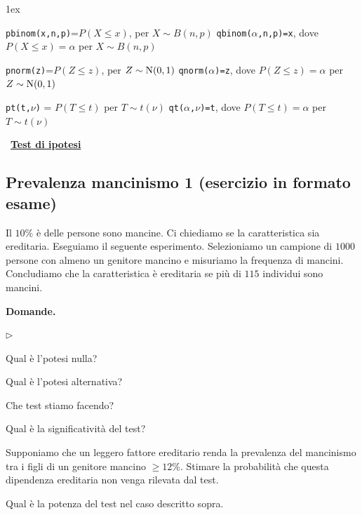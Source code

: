 \documentclass[11pt,openany]{book}
\newcommand{\mylabel}[1]{{\footnotesize\textsf{#1}}\hfill}
\renewenvironment{itemize}
  {\begin{list}{$\triangleright$}{%
   \setlength{\parskip}{0mm}
   \setlength{\topsep}{.2\baselineskip}
   \setlength{\rightmargin}{0mm}
   \setlength{\listparindent}{0mm}
   \setlength{\itemindent}{0mm}
   \setlength{\labelwidth}{3ex}
   \setlength{\itemsep}{.4\baselineskip}
   \setlength{\parsep}{0mm}
   \setlength{\partopsep}{0mm}
   \setlength{\labelsep}{1ex}
   \setlength{\leftmargin}{\labelwidth+\labelsep}
   \let\makelabel\mylabel}}{%
   \end{list}\vspace*{-1.3mm}}
\begin{document}
\vfill
\parskip1ex
{\hrulefill\scriptsize

{\tt pbinom(x,n,p)}=$P(X\le x)$, per $X\sim B(n,p)$
\hfill 
{\tt qbinom($\alpha$,n,p)=x},  dove $P(X\le x)=\alpha$ per $X\sim B(n,p)$

{\tt pnorm(z)}=$P(Z\le z)$, per $Z\sim {\rm N}(0,1)$
\hfill 
{\tt qnorm($\alpha$)=z},  dove $P(Z\le z)=\alpha$ per $Z\sim {\rm N}(0,1)$

{\tt pt(t,$\nu$)} = $P(T\le t)$ per $T\sim t(\nu)$
\hfill
{\tt qt($\alpha$,$\nu$)=t}, dove $P(T\le t)=\alpha$ per $T\sim t(\nu)$

}

\clearpage\
\hfill\textbf{{\color{brown}\hyperref[test_ipotesi]{Test di ipotesi \faShare}}}
\subsection{Prevalenza mancinismo 1 (esercizio in formato esame)}
\label{Prevalenza mancinismo 1}

Il $10\%$ è delle persone sono mancine. Ci chiediamo se la caratteristica sia ereditaria. Eseguiamo il seguente esperimento. Selezioniamo un campione di $1000$ persone con almeno un genitore mancino e misuriamo la frequenza di mancini. Concludiamo che la caratteristica \`e ereditaria se pi\`u di $115$ individui sono mancini.

\textbf{Domande.}

\begin{itemize}
\item[1.] Qual è l'potesi nulla?

\item[2.] Qual è l'potesi alternativa?

\item[3.] Che test stiamo facendo?

\item[4.] Qual è la significatività del test?

\item[5.] Supponiamo che un leggero fattore ereditario renda la prevalenza del mancinismo tra i figli di un genitore mancino $\ge12\%$. Stimare la probabilità che questa dipendenza ereditaria non venga rilevata dal test. 

\item[6.] Qual è la potenza del test nel caso descritto sopra.
\end{itemize}
\end{document}
